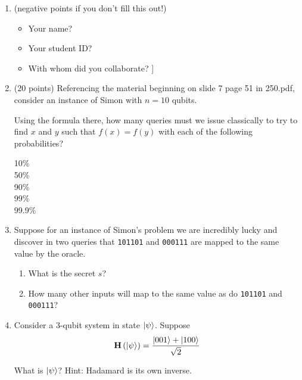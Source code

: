 \documentclass[12pt]{article}
\begin{document}


\begin{enumerate}[font=\bfseries]

\item {} (negative points if you don't fill this out!)
\begin{itemize}
    \item Your name?\Blank[20em]{}
    \item Your student ID?\Blank[12em]{}
    \item With whom did you collaborate?
    \LeaveSpace{}]
\end{itemize}

\item (20 points) Referencing the material beginning on slide 7 page 51 in 250.pdf, consider an instance of Simon with $n=10$ qubits.  

Using the formula there, how many queries must we issue classically to try to find $x$ and $y$ such that $f(x)=f(y)$ with each of the following probabilities?
\begin{description}
    \item[10\%] \Blank{}
    \item[50\%] \Blank{}
    \item[90\%] \Blank{}
    \item[99\%] \Blank{}
    \item[99.9\%] \Blank{}
\end{description}
\item{} Suppose for an instance of Simon's problem we are incredibly lucky and discover in two queries that \texttt{101101} and \texttt{000111} are mapped to the same value by the oracle.  \begin{enumerate}[label=\theenumi.\arabic*]
    \item What is the secret $s$?\Blank[1.5in]{}
    \item How many other inputs will map to the same value as do \texttt{101101} and \texttt{000111}?\Blank{}
\end{enumerate}

\item {} Consider a 3-qubit system in state $\ket{\psi}$.  Suppose \[ \textbf{H}\left(\ket{\psi}\right)=\frac{\ket{001}+\ket{100}}{\sqrt{2}}\] 

What is $\ket{\psi}$? 
Hint: Hadamard is its own inverse.
\LeaveSpace{}


\end{enumerate}
\end{document}
